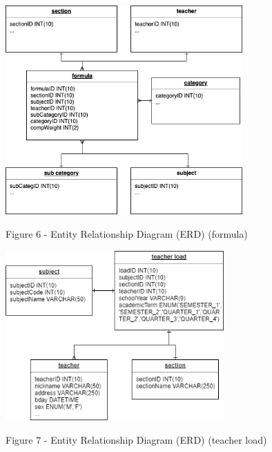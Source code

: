 \documentclass[11pt,a4paper,titlepage]{article}
\begin{document}
\vspace{1cm}
\begin{center}
    \includegraphics[height=8.0cm]{Formula.png}
\end{center}
\vspace{1cm}
\begin{center}
    Figure 6 - Entity Relationship Diagram (ERD) (formula)
\end{center}

\vspace{1cm}
\begin{center}
    \includegraphics[height=6.5cm]{Teacher-Load.png}
\end{center}
\vspace{1cm}
\begin{center}
    Figure 7 - Entity Relationship Diagram (ERD) (teacher load)
\end{center}
\end{document}
